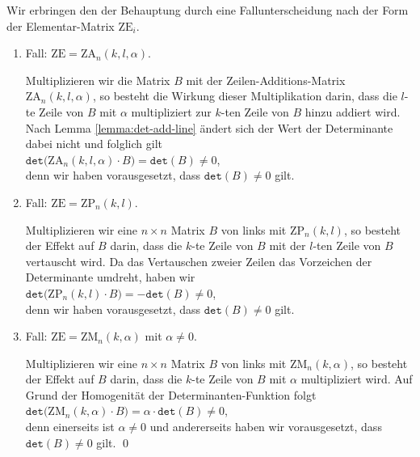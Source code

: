 \proof
Wir erbringen den der Behauptung durch eine Fallunterscheidung nach der Form der Elementar-Matrix $\mathrm{ZE}_i$.
\begin{enumerate}
\item Fall: $\mathrm{ZE} = \mathrm{ZA}_n(k,l,\alpha)$. 
  
      Multiplizieren wir die Matrix $B$ mit der Zeilen-Additions-Matrix $\mathrm{ZA}_n(k,l,\alpha)$,
      so besteht die Wirkung dieser Multiplikation darin, dass die $l$-te Zeile von $B$  mit $\alpha$ multipliziert
      zur $k$-ten Zeile von $B$ hinzu addiert wird.  Nach Lemma \ref{lemma:det-add-line}
      \"andert sich der Wert der Determinante dabei nicht und folglich gilt
      \\[0.2cm]
      \hspace*{1.3cm}
      $\mathtt{det}\bigl(\mathrm{ZA}_n(k,l,\alpha) \cdot B\bigr) = \mathtt{det}(B) \not= 0$,
      \\[0.2cm]
      denn wir haben vorausgesetzt, dass $\mathtt{det}(B) \not= 0$ gilt.
\item Fall: $\mathrm{ZE} = \mathrm{ZP}_n(k,l)$.

      Multiplizieren wir eine $n \times n$ Matrix $B$ von links mit
      $\mathrm{ZP}_n(k,l)$, so besteht der Effekt auf $B$ darin, dass die $k$-te Zeile von $B$ mit der
      $l$-ten Zeile von $B$ vertauscht wird.
      Da das Vertauschen zweier Zeilen das Vorzeichen der Determinante umdreht, haben wir
      \\[0.2cm]
      \hspace*{1.3cm}
      $\mathtt{det}\bigl(\mathrm{ZP}_n(k,l) \cdot B\bigr) = -\mathtt{det}(B) \not= 0$,
      \\[0.2cm]
      denn wir haben vorausgesetzt, dass $\mathtt{det}(B) \not= 0$ gilt.
\item Fall: $\mathrm{ZE} = \mathrm{ZM}_n(k, \alpha)$ \quad mit $\alpha \not= 0$.

      Multiplizieren wir eine $n \times n$ Matrix $B$ von links mit
      $\textrm{ZM}_n(k,\alpha)$, so besteht der Effekt auf $B$ darin, dass die $k$-te Zeile von $B$
      mit $\alpha$ multipliziert wird.
      Auf Grund der Homogenit\"at der Determinanten-Funktion folgt
      \\[0.2cm]
      \hspace*{1.3cm}
      $\mathtt{det}\bigl(\mathrm{ZM}_n(k,\alpha) \cdot B) = \alpha \cdot \mathtt{det}(B) \not= 0$,
      \\[0.2cm]
      denn einerseits ist $\alpha \not= 0$ und andererseits       
      haben wir vorausgesetzt, dass $\mathtt{det}(B) \not= 0$ gilt. \qed
\end{enumerate}


